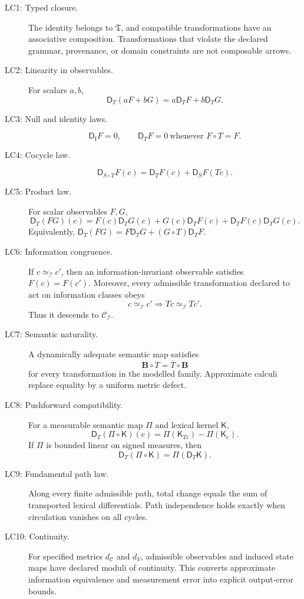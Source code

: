 \documentclass[11pt]{article}
\newcommand{\Ctxt}{\mathcal C}
\newcommand{\Trans}{\mathfrak T}
\newcommand{\Bmap}{\mathbf B}
\newcommand{\Kern}{\mathsf K}
\newcommand{\Dlex}{\mathsf D}
\newcommand{\Id}{\mathrm I}
\begin{document}
\begin{description}
\item[LC1: Typed closure.] The identity belongs to $\Trans$, and compatible transformations have an associative composition. Transformations that violate the declared grammar, provenance, or domain constraints are not composable arrows.

\item[LC2: Linearity in observables.] For scalars $a,b$,
\[
 \Dlex_T(aF+bG)=a\Dlex_TF+b\Dlex_TG.
\]

\item[LC3: Null and identity laws.]
\[
 \Dlex_{\Id}F=0,
 \qquad
 \Dlex_TF=0\ \text{whenever }F\circ T=F.
\]

\item[LC4: Cocycle law.]
\[
 \Dlex_{S\circ T}F(c)=\Dlex_TF(c)+\Dlex_SF(Tc).
\]

\item[LC5: Product law.] For scalar observables $F,G$,
\[
 \Dlex_T(FG)(c)
 =F(c)\Dlex_TG(c)+G(c)\Dlex_TF(c)
  +\Dlex_TF(c)\Dlex_TG(c).
\]
Equivalently, $\Dlex_T(FG)=F\Dlex_TG+(G\circ T)\Dlex_TF$.

\item[LC6: Information congruence.] If $c\simeq_{\mathcal I}c'$, then an information-invariant observable satisfies $F(c)=F(c')$. Moreover, every admissible transformation declared to act on information classes obeys
\[
 c\simeq_{\mathcal I}c'\Longrightarrow Tc\simeq_{\mathcal I}Tc'.
\]
Thus it descends to $\Ctxt_{\mathcal I}$.

\item[LC7: Semantic naturality.] A dynamically adequate semantic map satisfies
\[
 \Bmap\circ T=\overline T\circ\Bmap
\]
for every transformation in the modelled family. Approximate calculi replace equality by a uniform metric defect.

\item[LC8: Pushforward compatibility.] For a measurable semantic map $\Pi$ and lexical kernel $\Kern$,
\[
 \Dlex_T(\Pi\circ\Kern)(c)
 =\Pi(\Kern_{Tc})-\Pi(\Kern_c).
\]
If $\Pi$ is bounded linear on signed measures, then
\[
 \Dlex_T(\Pi\circ\Kern)=\Pi(\Dlex_T\Kern).
\]

\item[LC9: Fundamental path law.] Along every finite admissible path, total change equals the sum of transported lexical differentials. Path independence holds exactly when circulation vanishes on all cycles.

\item[LC10: Continuity.] For specified metrics $d_{\Ctxt}$ and $d_V$, admissible observables and induced state maps have declared moduli of continuity. This converts approximate information equivalence and measurement error into explicit output-error bounds.
\end{description}
\end{document}
